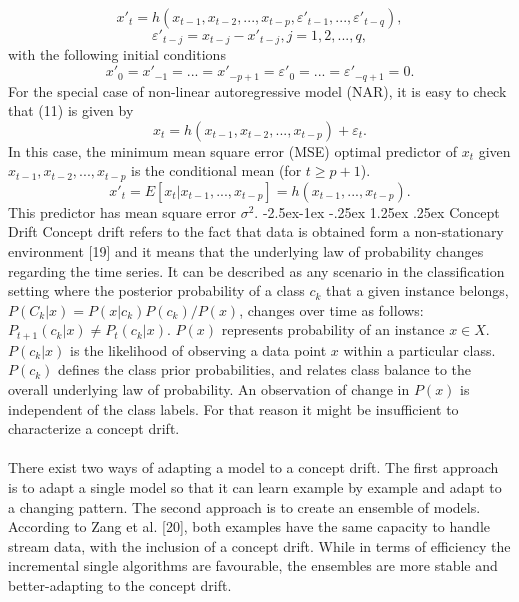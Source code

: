 \documentclass[runningheads,a4paper]{llncs}[2015/06/24]
\makeatletter
\renewcommand\paragraph{\@startsection{paragraph}{4}{\z@}%
            {-2.5ex\@plus -1ex \@minus -.25ex}%
            {1.25ex \@plus .25ex}%
            {\normalfont\normalsize\bfseries}}
\makeatother
\begin{document}
\begin{equation}
x'_t = h(x_{t−1}, x_{t−2},..., x_{t−p}, ε'_{t−1},..., ε'_{t−q} ), 
\end{equation}
\begin{equation}
ε'_{t− j} = x_{t− j} − x'_{t− j}, j = 1, 2,..., q,
\end{equation}
with the following initial conditions
\begin{equation}
x'_0 = x'_{−1} =...= x'_{−p+1} = ε'_0 =...= ε'_{−q+1} = 0. 
\end{equation}
For the special case of non-linear autoregressive model (NAR), it is easy to check that (11) is given by
\begin{equation}
x_t = h(x_{t−1}, x_{t−2},..., x_{t−p}) + ε_t .
\end{equation}
In this case, the minimum mean square error (MSE) optimal predictor of $x_t$ given $x_{t−1}, x_{t−2},..., x_{t−p}$ is the conditional mean (for $t ≥ p + 1$).
\begin{equation}
x'_t = E[x_t|x_{t−1},..., x_{t−p}] = h(x_{t−1},..., x_{t−p}).
\end{equation}
This predictor has mean square error $σ^2$.
\paragraph{Concept Drift}
Concept drift refers to the fact that data is obtained form a non-stationary environment [19] and it means that the underlying law of probability changes regarding the time series. It can be described as any scenario in the classification setting where the posterior probability of  a class $c_k$ that a given instance belongs, $P(C_k|x)= P(x|c_k)P(c_k)/P(x)$, changes over time as follows: $P_{t+1}(c_k|x)≠ P_t(c_k |x)$. $P(x)$ represents probability of an instance  $x ∈ X$. $P(c_k|x)$ is the likelihood of observing a data point $x$ within a particular class. $P(c_k)$ defines the class prior probabilities, and relates class balance to the overall underlying law of probability. An observation of change in $P(x)$ is independent of the class labels. For that reason it might be insufficient to characterize a concept drift. \\\\ There exist two ways of adapting a model to a concept drift. The first approach is to adapt a single model so that it can learn example by example and adapt to a changing pattern. The second approach is to create an ensemble of models. According to Zang et al. [20], both examples have the same capacity to handle stream data, with the inclusion of a concept drift. While in terms of efficiency the incremental single algorithms are favourable, the ensembles are more stable and better-adapting to the concept drift.	
\end{document}
